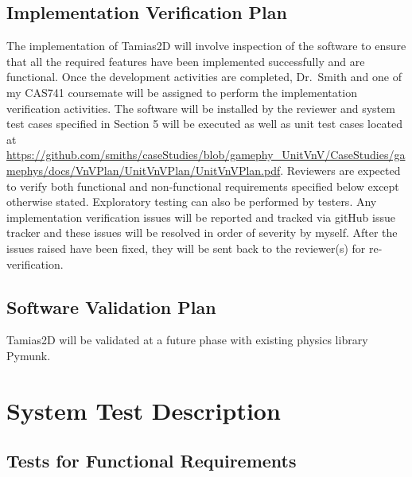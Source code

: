 \documentclass[12pt, titlepage]{article}
\newcommand{\progname}{Tamias2D}
\begin{document}
\subsection{Implementation Verification Plan}
 The implementation of \progname{} will involve inspection of the software to ensure that all the required features have been implemented successfully and are functional. Once the development activities are completed, Dr.\ Smith and one of my CAS741 coursemate will be assigned to perform the implementation verification activities. The software will be installed by the reviewer and system test cases specified in Section 5 will be executed as well as unit test cases located at \url{https://github.com/smiths/caseStudies/blob/gamephy_UnitVnV/CaseStudies/gamephys/docs/VnVPlan/UnitVnVPlan/UnitVnVPlan.pdf}. Reviewers are expected to verify both functional and non-functional requirements specified below except otherwise stated. Exploratory testing can also be performed by testers. Any implementation verification issues will be reported and tracked via gitHub issue tracker and these issues will be resolved in order of severity by myself. After the issues raised have been fixed, they will be sent back to the reviewer(s) for re-verification.

\subsection{Software Validation Plan}

\progname{} will be validated at a future phase with existing physics library Pymunk. 


\section{System Test Description}
	
\subsection{Tests for Functional Requirements}

\end{document}
